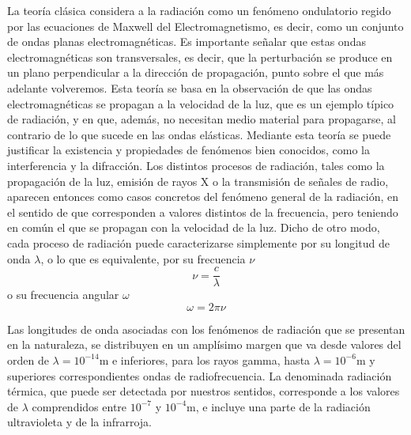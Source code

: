 La teoría clásica considera a la radiación como un fenómeno ondulatorio regido por las ecuaciones de Maxwell del Electromagnetismo, es decir, como un conjunto de ondas planas electromagnéticas.
Es importante señalar que estas ondas electromagnéticas son transversales, es decir, que la perturbación se produce en un plano perpendicular a la dirección de propagación, punto sobre el que más adelante volveremos.
Esta teoría se basa en la observación de que las ondas electromagnéticas se propagan a la velocidad de la luz, que es un ejemplo típico de radiación, y en que, además, no necesitan medio material para propagarse, al contrario de lo que sucede en las ondas elásticas.
Mediante esta teoría se puede justificar la existencia y propiedades de fenómenos bien conocidos, como la interferencia y la difracción.
Los distintos procesos de radiación, tales como la propagación de la luz, emisión de rayos X o la transmisión de señales de radio, aparecen entonces como casos concretos del fenómeno general de la radiación, en el sentido de que corresponden a valores distintos de la frecuencia, pero teniendo en común el que se propagan con la velocidad de la luz.
Dicho de otro modo, cada proceso de radiación puede caracterizarse simplemente por su longitud de onda $\lambda$, o lo que es equivalente, por su frecuencia $\nu$
\begin{equation}\label{eq:freq_t8}
	\nu = \frac{c}{\lambda}
\end{equation}
o su frecuencia angular $\omega$
\begin{equation}
	\omega = 2\pi\nu
\end{equation}

Las longitudes de onda asociadas con los fenómenos de radiación que se presentan en la naturaleza, se distribuyen en un amplísimo margen que va desde valores del orden de $\lambda = 10^{-14}$m e inferiores, para los rayos gamma, hasta $\lambda = 10^{-6}$m y superiores correspondientes ondas de radiofrecuencia.
La denominada radiación térmica, que puede ser detectada por nuestros sentidos, corresponde a los valores de $\lambda$ comprendidos entre $10^{-7}$ y $10^{-4}$m, e incluye una parte de la radiación ultravioleta y de la infrarroja.


